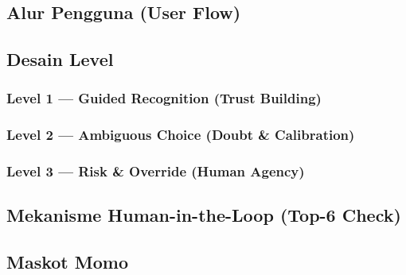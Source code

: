 \documentclass[12pt,a4paper,oneside,openany]{report}
\begin{document}
\subsection{Alur Pengguna (User Flow)}
\label{subsec:alur-pengguna}

\subsection{Desain Level}
\label{subsec:desain-level}

\subsubsection{Level 1 --- Guided Recognition (Trust Building)}

\subsubsection{Level 2 --- Ambiguous Choice (Doubt \& Calibration)}

\subsubsection{Level 3 --- Risk \& Override (Human Agency)}

\subsection{Mekanisme Human-in-the-Loop (Top-6 Check)}
\label{subsec:hitl-mekanisme}

\subsection{Maskot Momo}
\label{subsec:maskot-momo}
\end{document}
